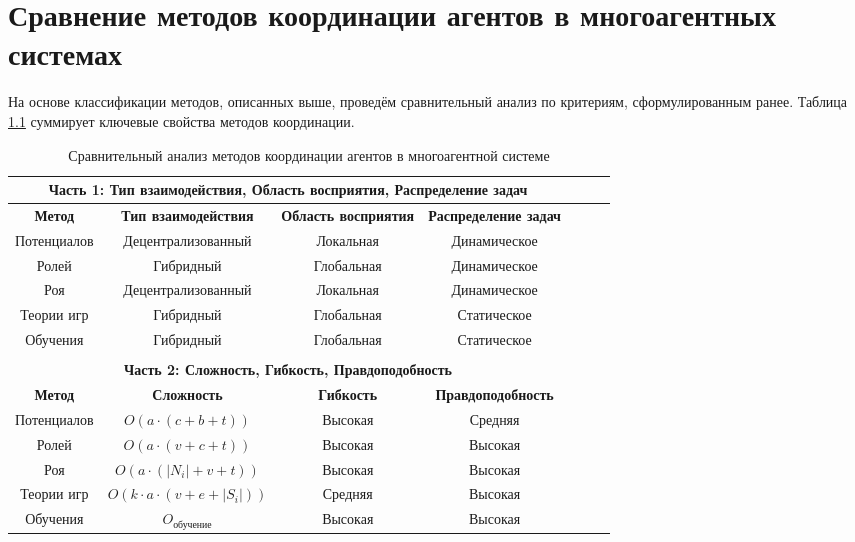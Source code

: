 \chapter{Сравнение методов координации агентов в многоагентных системах}

На основе классификации методов, описанных выше, проведём сравнительный анализ по критериям, сформулированным ранее. Таблица \ref{tab:comparison} суммирует ключевые свойства методов координации.

\begin{landscape}
	\begin{table}[H]
		\centering
		\caption{Сравнительный анализ методов координации агентов в многоагентной системе}
		\label{tab:comparison}
		\begin{tabular}{|c|c|c|c|c|c|c|}
			\hline
			\multicolumn{4}{|c|}{\textbf{Часть 1: Тип взаимодействия, Область восприятия, Распределение задач}} \\ \hline
			\textbf{Метод} & \textbf{Тип взаимодействия} & \textbf{Область восприятия} & \textbf{Распределение задач} \\ \hline
			Потенциалов    & Децентрализованный         & Локальная                  & Динамическое                 \\ \hline
			Ролей          & Гибридный                  & Глобальная                 & Динамическое                 \\ \hline
			Роя            & Децентрализованный         & Локальная                  & Динамическое                 \\ \hline
			Теории игр     & Гибридный                  & Глобальная                 & Статическое                  \\ \hline
			Обучения       & Гибридный                  & Глобальная                 & Статическое                  \\ \hline
			\multicolumn{4}{|c|}{} \\ %
			\hline
			\multicolumn{4}{|c|}{\textbf{Часть 2: Сложность, Гибкость, Правдоподобность}} \\ \hline
			\textbf{Метод} & \textbf{Сложность}         & \textbf{Гибкость}          & \textbf{Правдоподобность}    \\ \hline
			Потенциалов    & $O(a \cdot (c + b + t))$   & Высокая                    & Средняя                      \\ \hline
			Ролей          & $O(a \cdot (v + c + t))$   & Высокая                    & Высокая                      \\ \hline
			Роя            & $O(a \cdot (|N_i| + v + t))$ & Высокая                    & Высокая                      \\ \hline
			Теории игр     & $O(k \cdot a \cdot (v + e + |S_i|))$ & Средняя          & Высокая                      \\ \hline
			Обучения       & $O_{\text{обучение}}$      & Высокая                    & Высокая                      \\ \hline
		\end{tabular}
	\end{table}
\end{landscape}


